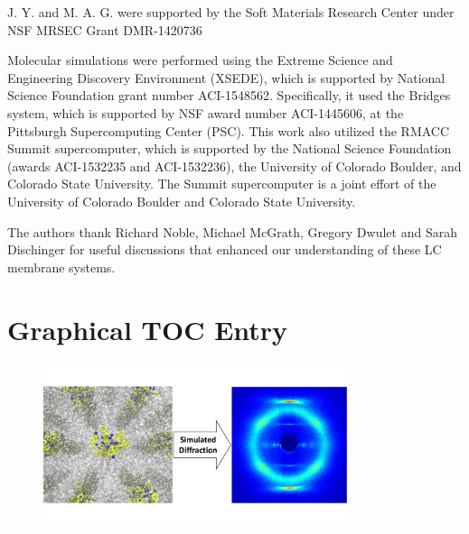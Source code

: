 \documentclass[journal=jpcbfk,manuscript=article]{achemso}
\begin{document}
  J. Y. and M. A. G. were supported by the Soft Materials Research Center under NSF 
  MRSEC Grant DMR-1420736

  Molecular simulations were performed using the Extreme Science and
  Engineering Discovery Environment (XSEDE), which is supported by National
  Science Foundation grant number ACI-1548562. Specifically, it used the Bridges
  system, which is supported by NSF award number ACI-1445606, at the Pittsburgh
  Supercomputing Center (PSC). This work also utilized the RMACC Summit supercomputer,
  which is supported by the National Science Foundation (awards ACI-1532235 and
  ACI-1532236), the University of Colorado Boulder, and Colorado State
  University. The Summit supercomputer is a joint effort of the University of
  Colorado Boulder and Colorado State University.

  The authors thank Richard Noble, Michael McGrath, Gregory Dwulet and Sarah Dischinger
  for useful discussions that enhanced our understanding of these LC membrane systems. 

  \clearpage
  
  
  \newpage
  
  \section*{Graphical TOC Entry}
  \begin{figure}
  \includegraphics[width=3.5in]{new_toc_graphic.pdf}
 \end{figure}
\end{document}
